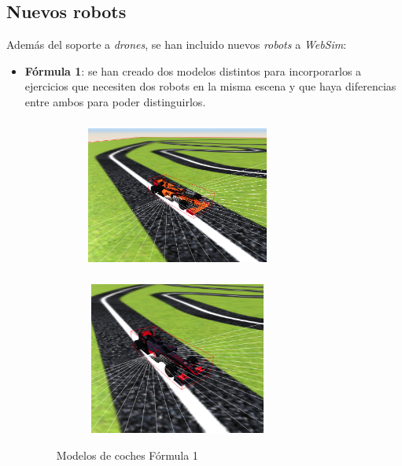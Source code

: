 \subsection{Nuevos robots}
\label{subsec:nuevosrobots}

Además del soporte a \textit{drones}, se han incluido nuevos \textit{robots} a \textit{WebSim}: 

\begin{itemize}
    \item \textbf{Fórmula 1}: se han creado dos modelos distintos para incorporarlos a ejercicios que necesiten dos robots en la misma escena y que haya diferencias entre ambos para poder distinguirlos. 
    
      \begin{figure}[H]
        \centering
        \begin{subfigure}{0.4\textwidth}
         \includegraphics[width=6cm, height=5cm]{img/f1_renault.png}
 \label{fig:f1_renault}
        \end{subfigure}
        \begin{subfigure}{0.4\textwidth}
         \includegraphics[width=6cm, height=5cm]{img/f1_williams.png}
   \label{fig:f1_williams}
        \end{subfigure}
          \caption{Modelos de coches Fórmula 1}
    \end{figure}


\end{itemize}
